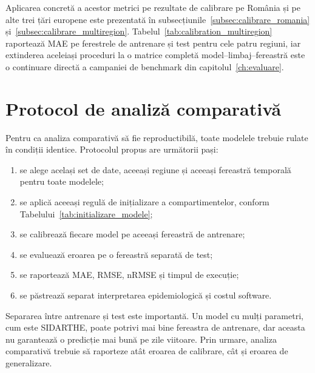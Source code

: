 Aplicarea concretă a acestor metrici pe rezultate de calibrare pe România
și pe alte trei țări europene este prezentată în
subsecțiunile~\ref{subsec:calibrare_romania} și~\ref{subsec:calibrare_multiregion}.
Tabelul~\ref{tab:calibration_multiregion} raportează MAE pe ferestrele de
antrenare și test pentru cele patru regiuni, iar extinderea aceleiași proceduri
la o matrice completă model--limbaj--fereastră este o continuare directă a
campaniei de benchmark din capitolul~\ref{ch:evaluare}.

\section{Protocol de analiză comparativă}
\label{sec:protocol_comparativ}

Pentru ca analiza comparativă să fie reproductibilă, toate modelele trebuie
rulate în condiții identice. Protocolul propus are următorii pași:

\begin{enumerate}
    \item se alege același set de date, aceeași regiune și aceeași fereastră
    temporală pentru toate modelele;
    \item se aplică aceeași regulă de inițializare a compartimentelor, conform
    Tabelului~\ref{tab:initializare_modele};
    \item se calibrează fiecare model pe aceeași fereastră de antrenare;
    \item se evaluează eroarea pe o fereastră separată de test;
    \item se raportează MAE, RMSE, nRMSE și timpul de execuție;
    \item se păstrează separat interpretarea epidemiologică și costul software.
\end{enumerate}

Separarea între antrenare și test este importantă. Un model cu mulți parametri,
cum este SIDARTHE, poate potrivi mai bine fereastra de antrenare, dar aceasta nu
garantează o predicție mai bună pe zile viitoare. Prin urmare, analiza
comparativă trebuie să raporteze atât eroarea de calibrare, cât și eroarea de
generalizare.

